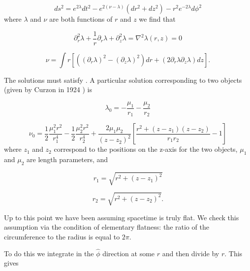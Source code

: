 \documentclass[12pt]{article}
\begin{document}
\begin{equation}
	ds^{2}=e^{2\lambda}dt^{2}-e^{2\left(\nu-\lambda\right)}\left(dr^{2}+dz^{2}\right)-r^{2}e^{-2\lambda}d\phi^{2}
	\label{eq:weyl-vacuum-metric}
\end{equation}
where $\lambda$ and $\nu$ are both functions of $r$ and $z$ we find that

\begin{equation}
\partial^{2}_{r}\lambda+\frac{1}{r}\partial_{r}\lambda+\partial^{2}_{z}\lambda=\nabla^2\lambda(r,z)=0
\label{eq:laplace-r-z}
\end{equation}

\begin{equation}
\nu=\int r[\left(\left(\partial_{r}\lambda\right)^{2}-\left(\partial_{z}\lambda\right)^{2}\right)dr+\left(2\partial_{r}\lambda\partial_{z}\lambda\right)dz].
\label{eq:nu}
\end{equation}

The solutions must satisfy . A particular solution corresponding to two objects (given by Curzon in 1924 \cite{curzon1924} ) is

\begin{equation}
\lambda_0=-\frac{\mu_1}{r_1}-\frac{\mu_2}{r_2}
\label{eq:lambda-0}
\end{equation}

\begin{equation}
	\label{eq:nu-0}
	\nu_0=\frac{1}{2}\frac{\mu_{1}^{2}r^2}{r_{1}^{4}}-\frac{1}{2}\frac{\mu_{2}^{2}r^2}{r_{2}^{4}}+\frac{2\mu_1\mu_2}{(z-z_2)^2}\left[\frac{r^2+(z-z_1)(z-z_2)}{r_{1}r_{2}}-1\right]
\end{equation}
where $z_1$ and $z_2$ correspond to the positions on the z-axis for the two objects, $\mu_1$ and $\mu_2$ are length parameters, and

\begin{equation}
r_1=\sqrt{r^2+(z-z_1)^2}
\label{eq:r_1}
\end{equation}

\begin{equation}
r_2=\sqrt{r^2+(z-z_2)^2}.
\label{eq:r_2}
\end{equation}

Up to this point we have been assuming spacetime is truly flat. We check this assumption via the condition of elementary flatness: the ratio of the circumference to the radius is equal to $2\pi$. 

To do this we integrate in the $\hat{\phi}$ direction at
some $r$ and then divide by $r$. This gives
\end{document}
